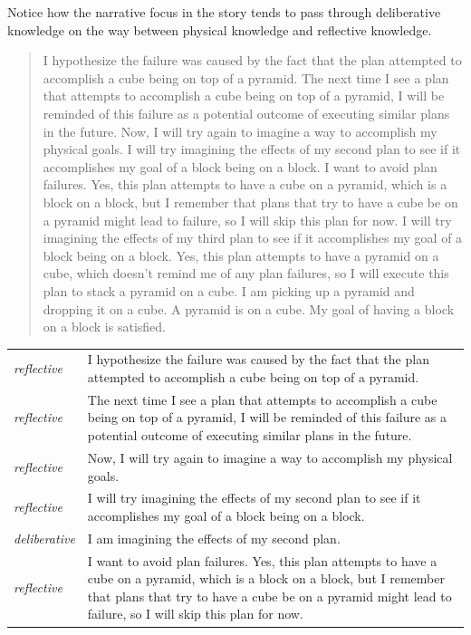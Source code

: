 Notice how the narrative focus in the story tends to pass through
deliberative knowledge on the way between physical knowledge and
reflective knowledge.

\begin{quote}
  I hypothesize the failure was caused by the fact that the plan
  attempted to accomplish a cube being on top of a pyramid.  The next
  time I see a plan that attempts to accomplish a cube being on top of
  a pyramid, I will be reminded of this failure as a potential outcome
  of executing similar plans in the future.  Now, I will try again to
  imagine a way to accomplish my physical goals.  I will try imagining
  the effects of my second plan to see if it accomplishes my goal of a
  block being on a block.  I want to avoid plan failures.  Yes, this
  plan attempts to have a cube on a pyramid, which is a block on a
  block, but I remember that plans that try to have a cube be on a
  pyramid might lead to failure, so I will skip this plan for now.  I
  will try imagining the effects of my third plan to see if it
  accomplishes my goal of a block being on a block.  Yes, this plan
  attempts to have a pyramid on a cube, which doesn't remind me of any
  plan failures, so I will execute this plan to stack a pyramid on a
  cube.  I am picking up a pyramid and dropping it on a cube.  A
  pyramid is on a cube.  My goal of having a block on a block is
  satisfied.
\end{quote}

\begin{tabular}{p{2cm}p{8cm}}
  {\emph{reflective}} & I hypothesize the failure was caused by the
  fact that the plan attempted to accomplish a cube being on top of a
  pyramid. \\

  {\emph{reflective}} & The next time I see a plan that attempts to
  accomplish a cube being on top of a pyramid, I will be reminded of
  this failure as a potential outcome of executing similar plans in
  the future. \\

  {\emph{reflective}} & Now, I will try again to imagine a way to
  accomplish my physical goals. \\

  {\emph{reflective}} & I will try imagining the effects of my second
  plan to see if it accomplishes my goal of a block being on a
  block. \\

  {\emph{deliberative}} & I am imagining the effects of my second plan. \\

  {\emph{reflective}} & I want to avoid plan failures.  Yes, this plan
  attempts to have a cube on a pyramid, which is a block on a block,
  but I remember that plans that try to have a cube be on a pyramid
  might lead to failure, so I will skip this plan for now. \\
\end{tabular}


